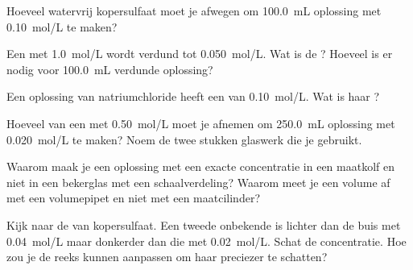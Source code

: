 \begin{exercise}[$\star$]\label{exo:g10:concentration-and-dilution:3}
Hoeveel watervrij kopersulfaat  moet je afwegen om
\qty{100.0}{mL} oplossing met \qty{0.10}{mol/L} te maken?
\end{exercise}

\begin{exercise}[$\star$]\label{exo:g10:concentration-and-dilution:4}
Een  met \qty{1.0}{mol/L} wordt verdund tot
\qty{0.050}{mol/L}. Wat is de ? Hoeveel 
is er nodig voor \qty{100.0}{mL} verdunde oplossing?
\end{exercise}

\begin{exercise}[$\star$]\label{exo:g10:concentration-and-dilution:5}
Een oplossing van natriumchloride heeft een  van
\qty{0.10}{mol/L}. Wat is haar ?
\end{exercise}

\begin{exercise}[$\star\star$]\label{exo:g10:concentration-and-dilution:6}
Hoeveel van een  met \qty{0.50}{mol/L} moet je afnemen om
\qty{250.0}{mL} oplossing met \qty{0.020}{mol/L} te maken? Noem de twee
stukken glaswerk die je gebruikt.
\end{exercise}

\begin{exercise}[$\star\star$]\label{exo:g10:concentration-and-dilution:7}
Waarom maak je een oplossing met een exacte concentratie in een maatkolf
en niet in een bekerglas met een schaalverdeling? Waarom meet je een
volume  af met een volumepipet en niet met een maatcilinder?
\end{exercise}

\begin{exercise}[$\star\star$]\label{exo:g10:concentration-and-dilution:8}
Kijk naar de  van kopersulfaat. Een tweede onbekende is lichter
dan de buis met \qty{0.04}{mol/L} maar donkerder dan die met
\qty{0.02}{mol/L}. Schat de concentratie. Hoe zou je de reeks kunnen
aanpassen om haar preciezer te schatten?
\end{exercise}


